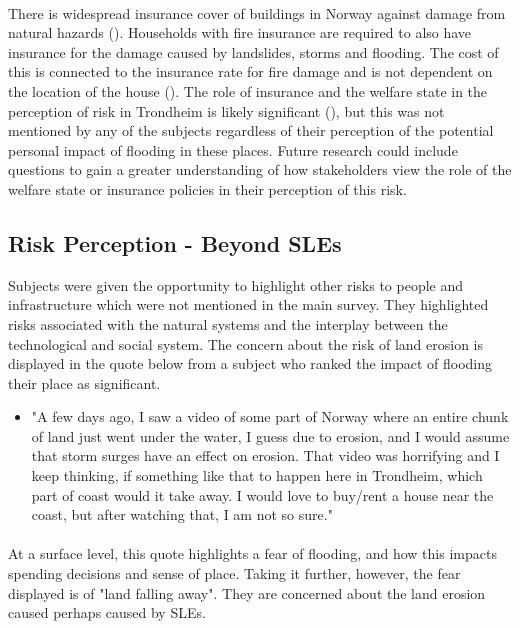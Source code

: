 \paragraph{}


There is widespread insurance cover of buildings in Norway against damage from natural hazards (\cite{lujala_role_2020}). Households with fire insurance are required to also have insurance for the damage caused by landslides, storms and flooding. The cost of this is connected to the insurance rate for fire damage and is not dependent on the location of the house (\cite{lujala_role_2020}). The role of insurance and the welfare state in the perception of risk in Trondheim is likely significant (\cite{lujala_role_2020}), but this was not mentioned by any of the subjects regardless of their perception of the potential personal impact of flooding in these places. Future research could include questions to gain a greater understanding of how stakeholders view the role of the welfare state or insurance policies in their perception of this risk. 

\subsection{Risk Perception - Beyond SLEs}
Subjects were given the opportunity to highlight other risks to people and infrastructure which were not mentioned in the main survey. They highlighted risks associated with the natural systems and the interplay between the technological and social system. The concern about the risk of land erosion is displayed in the quote below from a subject who ranked the impact of flooding their place as significant.

\begin{itemize}
    \item "A few days ago, I saw a video of some part of Norway where an entire chunk of land just went under the water, I guess due to erosion, and I would assume that storm surges have an effect on erosion. That video was horrifying and I keep thinking, if something like that to happen here in Trondheim, which part of coast would it take away. I would love to buy/rent a house near the coast, but after watching that, I am not so sure."
\end{itemize}
\paragraph{}

At a surface level, this quote highlights a fear of flooding, and how this impacts spending decisions and sense of place. Taking it further, however, the fear displayed is of "land falling away". They are concerned about the land erosion caused perhaps caused by SLEs.
